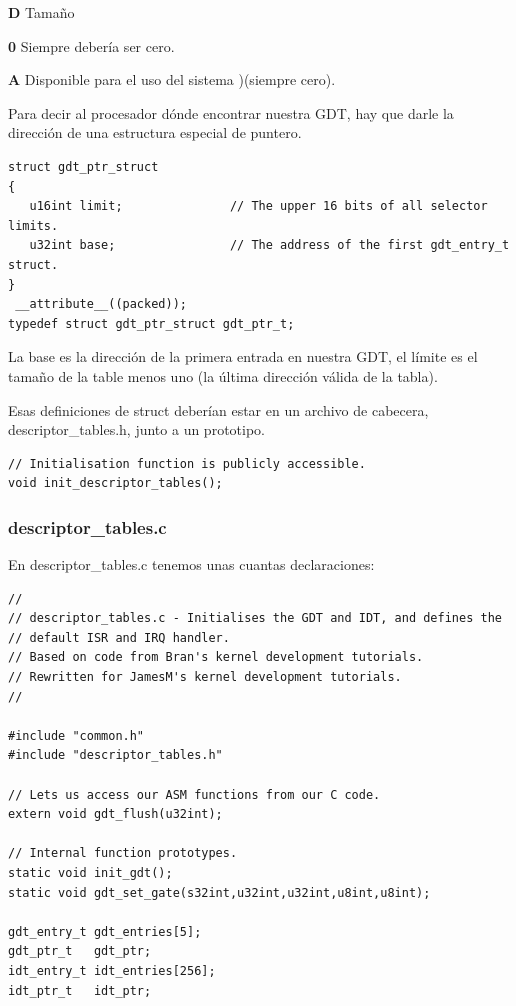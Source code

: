 \documentclass{report}
\begin{document}
\textbf{D} Tamaño

\textbf{0} Siempre debería ser cero.

\textbf{A} Disponible para el uso del sistema )(siempre cero).

Para decir al procesador dónde encontrar nuestra GDT, hay que darle la dirección de una estructura especial de puntero.

\begin{lstlisting}
struct gdt_ptr_struct
{
   u16int limit;               // The upper 16 bits of all selector limits.
   u32int base;                // The address of the first gdt_entry_t struct.
}
 __attribute__((packed));
typedef struct gdt_ptr_struct gdt_ptr_t;
\end{lstlisting}

La base es la dirección de la primera entrada en nuestra GDT, el límite es el tamaño de la table menos uno (la última dirección válida de la tabla).

Esas definiciones de struct deberían estar en un archivo de cabecera, descriptor\_tables.h, junto a un prototipo.

\begin{lstlisting}
// Initialisation function is publicly accessible.
void init_descriptor_tables();
\end{lstlisting}

\subsubsection{descriptor\_tables.c}

En descriptor\_tables.c tenemos unas cuantas declaraciones:

\begin{lstlisting}
//
// descriptor_tables.c - Initialises the GDT and IDT, and defines the 
// default ISR and IRQ handler.
// Based on code from Bran's kernel development tutorials.
// Rewritten for JamesM's kernel development tutorials.
//

#include "common.h"
#include "descriptor_tables.h"

// Lets us access our ASM functions from our C code.
extern void gdt_flush(u32int);

// Internal function prototypes.
static void init_gdt();
static void gdt_set_gate(s32int,u32int,u32int,u8int,u8int);

gdt_entry_t gdt_entries[5];
gdt_ptr_t   gdt_ptr;
idt_entry_t idt_entries[256];
idt_ptr_t   idt_ptr;
\end{lstlisting}
\end{document}

